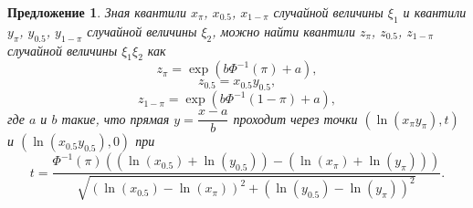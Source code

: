 \documentclass[specialist, substylefile = spbu.rtx,
subf,href,colorlinks=true, 12pt]{disser}
\newtheorem{proposition}[theorem]{Предложение}
\begin{document}
	\begin{proposition}\label{pr11}
		Зная квантили $x_{\pi}$, $x_{0.5}$, $x_{1-\pi}$ случайной величины $\xi_{1}$ и квантили $y_{\pi}$, $y_{0.5}$, $y_{1-\pi}$ случайной величины $\xi_{2}$, можно найти квантили $z_{\pi}$, $z_{0.5}$, $z_{1-\pi}$ случайной величины $\xi_{1}\xi_{2}$ как
		\begin{equation*}
			z_{\pi}=\exp(b\Phi^{-1}(\pi)+a),
		\end{equation*}
		\begin{equation*}
			z_{0.5}=x_{0.5}y_{0.5},
		\end{equation*}
		\begin{equation*}
			z_{1-\pi}=\exp(b\Phi^{-1}(1-\pi)+a),
		\end{equation*}
		где $a$ и $b$ такие, что прямая $y=\dfrac{x-a}{b}$ проходит через точки $(\ln(x_{\pi}y_{\pi}), t)$ и $(\ln(x_{0.5}y_{0.5}),0)$ при
		\begin{equation*}
			t = \frac{\Phi^{-1}(\pi)((\ln(x_{0.5})+\ln(y_{0.5}))-(\ln(x_{\pi})+\ln(y_{\pi})))}{\sqrt{(\ln(x_{0.5})-\ln(x_{\pi}))^{2}+(\ln(y_{0.5})-\ln(y_{\pi}))^{2}}}. 
		\end{equation*}
	\end{proposition}
\end{document}
